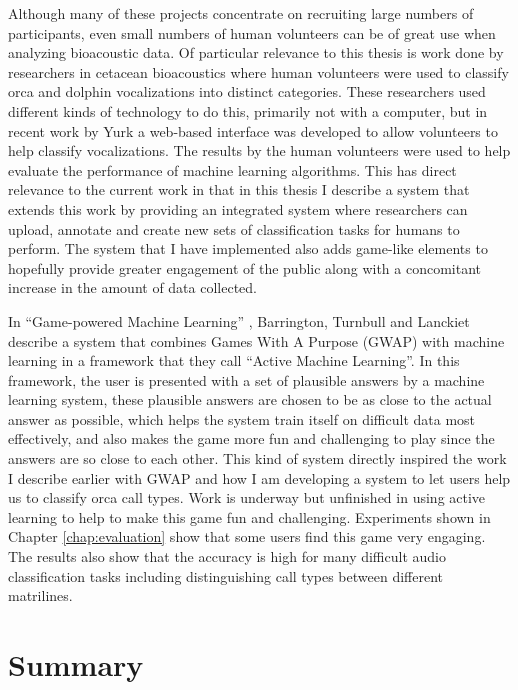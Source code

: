 Although many of these projects concentrate on recruiting large
numbers of participants, even small numbers of human volunteers can be
of great use when analyzing bioacoustic data.  Of particular relevance
to this thesis is work done by researchers in cetacean bioacoustics
\cite{ford1991vocal} \cite{yurk2010sequential} \cite{yurkphd}
\cite{king2012imitation} where human volunteers were used to classify
orca and dolphin vocalizations into distinct categories.  These
researchers used different kinds of technology to do this, primarily
not with a computer, but in recent work by Yurk \cite{yurk2010sequential}
\cite{yurkphd} a web-based interface was developed to allow volunteers
to help classify vocalizations.  The results by the human volunteers
were used to help evaluate the performance of machine learning
algorithms.  This has direct relevance to the current work in that in
this thesis I describe a system that extends this work by providing
an integrated system where researchers can upload, annotate and create
new sets of classification tasks for humans to perform.  The system
that I have implemented also adds game-like elements to hopefully
provide greater engagement of the public along with a concomitant
increase in the amount of data collected.

In ``Game-powered Machine Learning'' \cite{barrington2012game},
Barrington, Turnbull and Lanckiet describe a system that combines
Games With A Purpose (GWAP) with machine learning in a framework that
they call ``Active Machine Learning''.  In this framework, the user is
presented with a set of plausible answers by a machine learning
system, these plausible answers are chosen to be as close to the
actual answer as possible, which helps the system train itself on
difficult data most effectively, and also makes the game more fun and
challenging to play since the answers are so close to each other.
This kind of system directly inspired the work I describe earlier
with GWAP and how I am developing a system to let users help us to
classify orca call types.  Work is underway but unfinished in using active
learning to help to make this game fun and challenging.  Experiments
shown in Chapter \ref{chap:evaluation} show that some users find this
game very engaging.  The results also show that the accuracy is high
for many difficult audio classification tasks including distinguishing
call types between different matrilines.

\section{Summary}
\label{section:relatedWork:summary}

